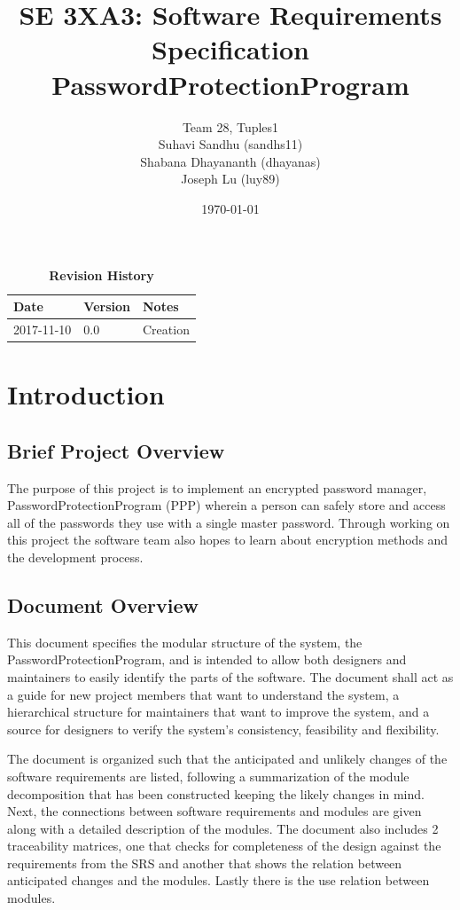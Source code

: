 \documentclass[12pt, titlepage]{article}
\title{SE 3XA3: Software Requirements Specification\\PasswordProtectionProgram}
\author{Team 28, Tuples1
		\\ Suhavi Sandhu (sandhs11)
		\\ Shabana Dhayananth (dhayanas)
		\\ Joseph Lu (luy89)
}
\date{\today}
\begin{document}
\maketitle

\tableofcontents
\listoftables
\listoffigures

\begin{table}[bp]
\caption{\bf Revision History}
\begin{tabularx}{\textwidth}{p{3cm}p{2cm}X}
\toprule {\bf Date} & {\bf Version} & {\bf Notes}\\
\midrule
2017-11-10 & 0.0 & Creation\\
\bottomrule
\end{tabularx}
\end{table}

\newpage


\section{Introduction}\label{Intro}

\subsection{Brief Project Overview} \label{ProjOver}
The purpose of this project is to implement an encrypted password manager, PasswordProtectionProgram (PPP) wherein a person can 
safely store and access all of the passwords they use with a single master password. Through working on this project the software 
team also hopes to learn about encryption methods and the development process.

\subsection{Document Overview} \label{DocOver}
This document specifies the modular structure of the system, the 
PasswordProtectionProgram, and is intended to allow both designers and 
maintainers to easily identify the parts of the software. The document 
shall act as a guide for new project members that want to understand 
the system, a hierarchical structure for maintainers that want to 
improve the system, and a source for designers to verify the system’s 
consistency, feasibility and flexibility.

The document is organized such that the anticipated and unlikely 
changes of the software requirements are listed, following a 
summarization of the module decomposition that has been constructed 
keeping the likely changes in mind. Next, the connections between 
software requirements and modules are given along with a detailed 
description of the modules. The document also includes 2 traceability 
matrices, one that checks for completeness of the design against the 
requirements from the SRS and another that shows the relation between 
anticipated changes and the modules. Lastly there is the use relation 
between modules.
\end{document}
